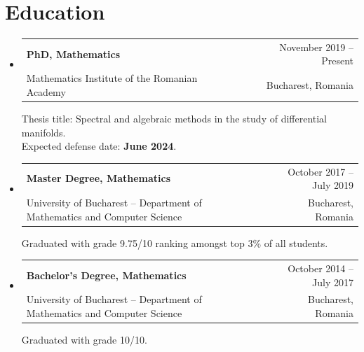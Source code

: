 \documentclass[a4paper, 11pt]{article}
\makeatletter
\newcommand{\CVSubheading}[4]{
  \vspace{-2pt}\item
    \begin{tabular*}{0.97\textwidth}[t]{l@{\extracolsep{\fill}}r}
      \textbf{#1} & #2 \\
      #3 & \ #4 \\
    \end{tabular*}\vspace{-7pt}
}
\newcommand{\CVSubHeadingListStart}{\begin{itemize}[leftmargin=0.5cm, label={}]}
\newcommand{\CVSubHeadingListEnd}{\end{itemize}}
\makeatother
\begin{document}
\section{Education}
  \CVSubHeadingListStart
    \CVSubheading
      {PhD, Mathematics}{November 2019 -- Present}
      {Mathematics Institute of the Romanian Academy}{Bucharest, Romania}

Thesis title: Spectral and algebraic methods in the study of differential manifolds.\\
Expected defense date: \textbf{June 2024}.
    \CVSubheading
      {Master Degree, Mathematics}{October 2017 -- July 2019}
      {University of Bucharest -- Department of Mathematics and Computer Science}{Bucharest, Romania}
      
Graduated with grade 9.75/10 ranking amongst top 3\% of all students.
    \CVSubheading
      {Bachelor's Degree, Mathematics}{October 2014 -- July 2017}
      {University of Bucharest -- Department of Mathematics and Computer Science}{Bucharest, Romania}
      
Graduated with grade 10/10.
  \CVSubHeadingListEnd

\end{document}
